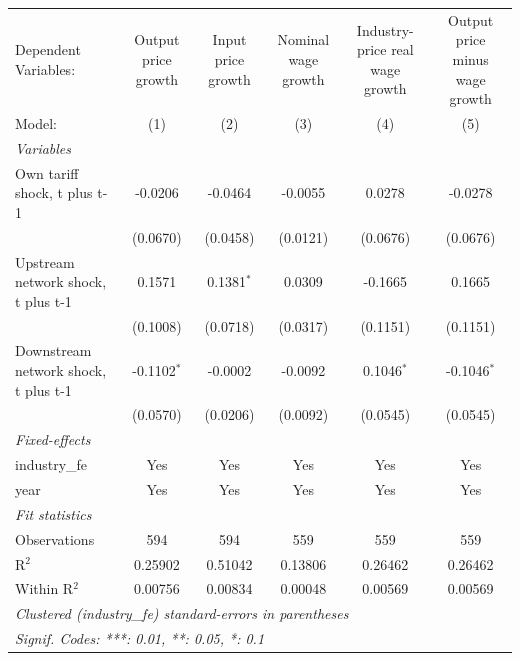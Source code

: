\begingroup
\centering
\begin{tabular}{lccccc}
   \tabularnewline \midrule \midrule
   Dependent Variables:                 & Output price growth & Input price growth & Nominal wage growth & Industry-price real wage growth & Output price minus wage growth\\  
   Model:                               & (1)                 & (2)                & (3)                 & (4)                             & (5)\\  
   \midrule
   \emph{Variables}\\
   Own tariff shock, t plus t-1         & -0.0206             & -0.0464            & -0.0055             & 0.0278                          & -0.0278\\   
                                        & (0.0670)            & (0.0458)           & (0.0121)            & (0.0676)                        & (0.0676)\\   
   Upstream network shock, t plus t-1   & 0.1571              & 0.1381$^{*}$       & 0.0309              & -0.1665                         & 0.1665\\   
                                        & (0.1008)            & (0.0718)           & (0.0317)            & (0.1151)                        & (0.1151)\\   
   Downstream network shock, t plus t-1 & -0.1102$^{*}$       & -0.0002            & -0.0092             & 0.1046$^{*}$                    & -0.1046$^{*}$\\   
                                        & (0.0570)            & (0.0206)           & (0.0092)            & (0.0545)                        & (0.0545)\\   
   \midrule
   \emph{Fixed-effects}\\
   industry\_fe                         & Yes                 & Yes                & Yes                 & Yes                             & Yes\\  
   year                                 & Yes                 & Yes                & Yes                 & Yes                             & Yes\\  
   \midrule
   \emph{Fit statistics}\\
   Observations                         & 594                 & 594                & 559                 & 559                             & 559\\  
   R$^2$                                & 0.25902             & 0.51042            & 0.13806             & 0.26462                         & 0.26462\\  
   Within R$^2$                         & 0.00756             & 0.00834            & 0.00048             & 0.00569                         & 0.00569\\  
   \midrule \midrule
   \multicolumn{6}{l}{\emph{Clustered (industry\_fe) standard-errors in parentheses}}\\
   \multicolumn{6}{l}{\emph{Signif. Codes: ***: 0.01, **: 0.05, *: 0.1}}\\
\end{tabular}
\par\endgroup
